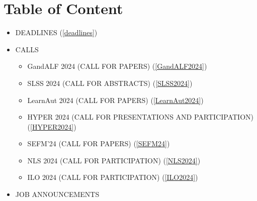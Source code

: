 \documentclass[prodmode,acmtecs]{acmsmall} %
\begin{document}
\section{Table of Content}\begin{itemize}\item DEADLINES (\cref{deadlines}) 
 
\item CALLS 
 
\begin{itemize}\item GandALF 2024 (CALL FOR PAPERS) (\cref{GandALF2024})
\item SLSS 2024 (CALL FOR ABSTRACTS) (\cref{SLSS2024})
\item LearnAut 2024 (CALL FOR PAPERS) (\cref{LearnAut2024})
\item HYPER 2024 (CALL FOR PRESENTATIONS AND PARTICIPATION) (\cref{HYPER2024})
\item SEFM'24 (CALL FOR PAPERS) (\cref{SEFM24})
\item NLS 2024 (CALL FOR PARTICIPATION) (\cref{NLS2024})
\item ILO 2024 (CALL FOR PARTICIPATION) (\cref{ILO2024})
\end{itemize} 
\item JOB ANNOUNCEMENTS 
 

\end{itemize}
\end{document}
